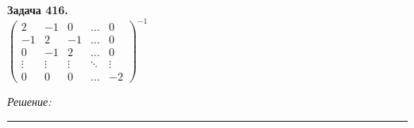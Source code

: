 \documentclass[a4paper, 12pt]{article}
\newenvironment{problem}[2][Задача]
{ \begin{mdframed}[backgroundcolor=gray!10] \textbf{#1 #2.} \\}
	{  \end{mdframed}}
\newenvironment{solution}
{\textit{Решение:}\vspace{.1cm}\\}
{\vspace{.1cm}\noindent\rule{7in}{1.5pt}}
\begin{document}
\begin{problem}{416}
$\left( \begin{array}{ccccc}2 & -1 & 0 & \ldots & 0 \\ -1 & 2 & -1 & \ldots & 0 \\ 0 & -1 & 2 & \ldots & 0 \\ \vdots & \vdots & \vdots & \ddots & \vdots \\ 0 & 0 & 0 & \ldots & -2 \end{array} \right)^{-1}$

\end{problem}
\begin{solution}


\end{solution} 
\end{document}

